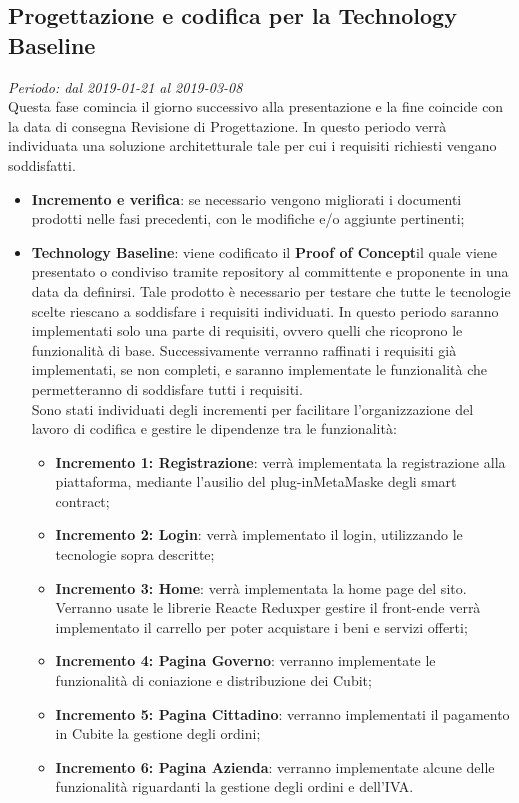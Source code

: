 \subsection{Progettazione e codifica per la Technology Baseline}
\textit{Periodo: dal 2019-01-21 al 2019-03-08} \\
Questa fase comincia il giorno successivo alla presentazione e la fine coincide con la data di consegna Revisione di 
Progettazione. In questo periodo verrà individuata una soluzione architetturale tale per cui i requisiti richiesti vengano soddisfatti.
\begin{itemize}
	\item \textbf{Incremento e verifica}: se necessario vengono migliorati i documenti prodotti nelle fasi precedenti, con le modifiche e/o aggiunte pertinenti;
	\item \textbf{Technology Baseline}: %
	viene codificato il \textbf{Proof of Concept}\glosp il quale viene presentato o condiviso tramite repository al committente e proponente in una data da definirsi. Tale prodotto è necessario per testare che tutte le tecnologie scelte riescano a soddisfare i requisiti individuati. In questo periodo saranno implementati solo una parte di requisiti, ovvero quelli che ricoprono le funzionalità di base. Successivamente verranno raffinati i requisiti già implementati, se non completi, e saranno implementate le funzionalità che permetteranno di soddisfare tutti i requisiti. \\
	Sono stati individuati degli incrementi per facilitare l'organizzazione del lavoro di codifica e gestire le dipendenze tra le funzionalità:
	\begin{itemize}
		\item \textbf{Incremento 1: Registrazione}: verrà implementata la registrazione alla piattaforma, mediante l'ausilio del plug-in\glosp MetaMask\glosp e degli smart contract\glo;
		\item \textbf{Incremento 2: Login}: verrà implementato il login, utilizzando le tecnologie sopra descritte;
		\item \textbf{Incremento 3: Home}: verrà implementata la home page del sito. Verranno usate le librerie React\glosp e Redux\glosp per gestire il front-end\glosp e verrà implementato il carrello per poter acquistare i beni e servizi offerti;
		\item \textbf{Incremento 4: Pagina Governo}: verranno implementate le funzionalità di coniazione e distribuzione dei Cubit\glo;
		\item \textbf{Incremento 5: Pagina Cittadino}: verranno implementati il pagamento in Cubit\glosp e la gestione degli ordini;
		\item \textbf{Incremento 6: Pagina Azienda}: verranno implementate alcune delle funzionalità riguardanti la gestione degli ordini e dell'IVA.
	\end{itemize}

\end{itemize}

